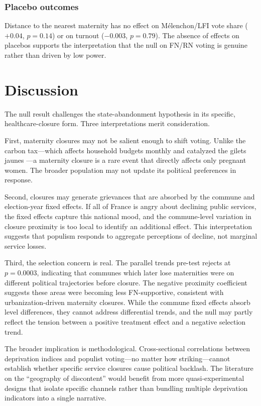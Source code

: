 \documentclass[12pt]{article}
\begin{document}
\subsubsection*{Placebo outcomes} Distance to the nearest maternity has no effect on M\'{e}lenchon/LFI vote share ($+0.04$, $p = 0.14$) or on turnout ($-0.003$, $p = 0.79$). The absence of effects on placebos supports the interpretation that the null on FN/RN voting is genuine rather than driven by low power.




\section{Discussion}

The null result challenges the state-abandonment hypothesis in its specific, healthcare-closure form. Three interpretations merit consideration.

First, maternity closures may not be salient enough to shift voting. Unlike the carbon tax---which affects household budgets monthly and catalyzed the gilets jaunes \citep{douenne2022yellow}---a maternity closure is a rare event that directly affects only pregnant women. The broader population may not update its political preferences in response.

Second, closures may generate grievances that are absorbed by the commune and election-year fixed effects. If all of France is angry about declining public services, the fixed effects capture this national mood, and the commune-level variation in closure proximity is too local to identify an additional effect. This interpretation suggests that populism responds to aggregate perceptions of decline, not marginal service losses.

Third, the selection concern is real. The parallel trends pre-test rejects at $p = 0.0003$, indicating that communes which later lose maternities were on different political trajectories before closure. The negative proximity coefficient suggests these areas were becoming less FN-supportive, consistent with urbanization-driven maternity closures. While the commune fixed effects absorb level differences, they cannot address differential trends, and the null may partly reflect the tension between a positive treatment effect and a negative selection trend.

The broader implication is methodological. Cross-sectional correlations between deprivation indices and populist voting---no matter how striking---cannot establish whether specific service closures cause political backlash. The literature on the ``geography of discontent'' would benefit from more quasi-experimental designs that isolate specific channels rather than bundling multiple deprivation indicators into a single narrative.
\end{document}
